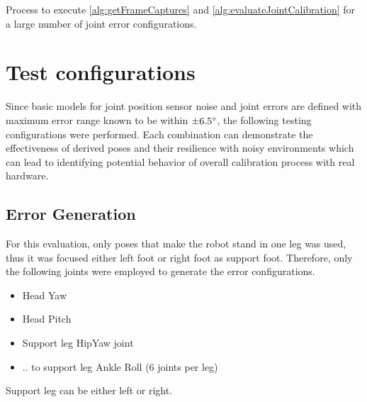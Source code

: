 \documentclass[english, printversion, nomenclature, notitle]{tuvisionthesis} %
\begin{document}
\begin{algorithm}[H]
	\caption{Process to execute \cref{alg:getFrameCaptures} and \cref{alg:evaluateJointCalibration} for a large number of joint error configurations.}	\label{alg:EvaluateCalibrationPoses}
	\BlankLine
\end{algorithm}

\section{Test configurations}

Since basic models for joint position sensor noise and joint errors are defined with maximum error range known to be within $\pm 6.5\degree$, the following testing configurations were performed. Each combination can demonstrate the effectiveness of derived poses and their resilience with noisy environments which can lead to identifying potential behavior of overall calibration process with real hardware.


\subsection{Error Generation}
For this evaluation, only poses that make the robot stand in one leg was used, thus it was focused either left foot or right foot as support foot. Therefore, only the following joints were employed to generate the error configurations.

\begin{itemize}
	\item Head Yaw
	\item Head Pitch
	\item Support leg HipYaw joint
	\item .. to support leg Ankle Roll (6 joints per leg)
\end{itemize}
Support leg can be either left or right.
\end{document}
